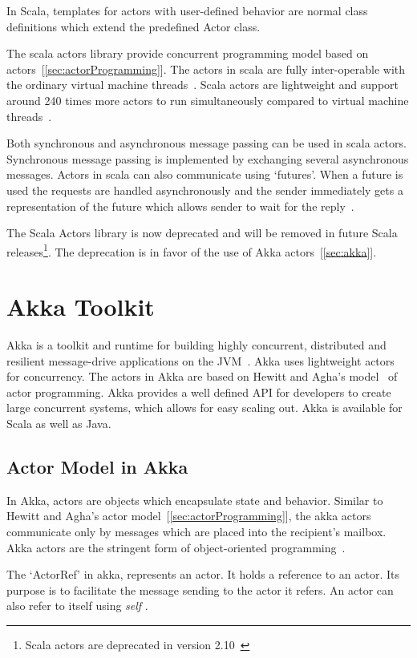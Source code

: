   In Scala, templates for actors with user-defined behavior are normal class definitions which extend the predefined Actor class.

  The scala actors library provide concurrent programming model based on actors~[\autoref{sec:actorProgramming}]. The actors in scala are fully inter-operable with the ordinary virtual machine threads~\cite{Haller}. Scala actors are lightweight and support around 240 times more actors to run simultaneously compared to virtual machine threads~\cite{Haller}.

  Both synchronous and asynchronous message passing can be used in scala actors. Synchronous message passing is implemented by exchanging several asynchronous messages. Actors in scala can also communicate using ‘futures’. When a future is used the requests are handled asynchronously and the sender immediately gets a representation of the future which allows sender to wait for the reply~\cite{scalaActors}.

  The Scala Actors library is now deprecated and will be removed in future Scala releases\footnote{Scala actors are deprecated in version 2.10~\cite{scalaActorsAPI}}. The deprecation is in favor of the use of Akka actors~[\autoref{sec:akka}].

\section{Akka Toolkit}
\label{sec:akka}
Akka is a toolkit and runtime for building highly concurrent, distributed and resilient message-drive applications on the JVM~\cite{akkaHome}. Akka uses lightweight actors for concurrency. The actors in Akka are based on Hewitt and Agha's model~\cite{agha, hewitt} of actor programming. Akka provides a well defined API for developers to create large concurrent systems, which allows for easy scaling out.
  Akka is available for Scala as well as Java.

  \subsection{Actor Model in Akka}
  In Akka, actors are objects which encapsulate state and behavior. Similar to Hewitt and Agha's actor model~[\autoref{sec:actorProgramming}], the akka actors communicate only by messages which are placed into the recipient’s mailbox. Akka actors are the stringent form of object-oriented programming~\cite{akkaActorSystem}.

  The ‘ActorRef’ in akka, represents an actor. It holds a reference to an actor. Its purpose is to facilitate the message sending to the actor it refers. An actor can also refer to itself using \emph{self} \cite{akkaJavaDoc}.

